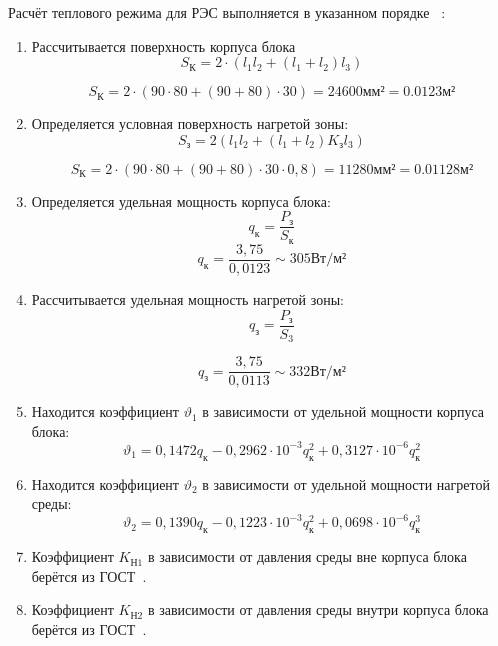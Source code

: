Расчёт теплового режима для РЭС выполняется в указанном порядке
~\cite{Rotkop1976}:
\begin{enumerate}
\item Рассчитывается поверхность корпуса блока
  \begin{equation}
    S_{К} = 2 \cdot (l_1 l_2 + (l_1+ l_2)l_3) %
  \end{equation}

  $$S_{К} = 2 \cdot (90 \cdot 80 + (90 + 80) \cdot 30) = 24600 мм² = 0.0123 м²$$
  
\item Определяется условная поверхность нагретой зоны:
  \begin{equation}
    S_{з} = 2 (l_1 l_2 + (l_1 + l_2) K_{з} l_3 ) %
  \end{equation}

  $$S_{К} = 2 \cdot (90 \cdot 80 + (90 + 80) \cdot 30 \cdot 0,8) = 11280 мм² = 0.01128м²$$
\item Определяется удельная мощность корпуса блока:
%
\begin{equation}
  q_к = \frac{P_з}{S_к} %
\end{equation}
%
$$ q_к = \frac{3,75}{0,0123} \sim 305 Вт/м² $$

\item Рассчитывается удельная мощность нагретой зоны:
  \begin{equation}
      q_з = \frac{P_з}{S_3} %
    \end{equation}

$$ q_з = \frac{3,75}{0,0113} \sim 332 Вт/м² $$
\item Находится коэффициент $\vartheta_1$ в зависимости от удельной мощности корпуса блока:
\begin{equation}
\vartheta_1 = 0,1472q_к - 0,2962 \cdot 10^{-3}q_к^2 + 0,3127 \cdot 10^{-6}q_к^2
\end{equation}

\item Находится коэффициент $\vartheta_2$ в зависимости от удельной мощности нагретой среды:
%
\begin{equation}
\vartheta_2 = 0,1390q_к - 0,1223 \cdot 10^{-3}q_к^2 + 0,0698 \cdot 10^{-6}q_к^3
\end{equation}

\item Коэффициент $K_{Н1}$ в зависимости от давления
  среды вне корпуса блока берётся из ГОСТ~\cite{GOST-15150-69}.

\item Коэффициент $K_{Н2}$ в зависимости от давления
  среды внутри корпуса блока берётся из ГОСТ~\cite{GOST-15150-69}.


\end{enumerate}
